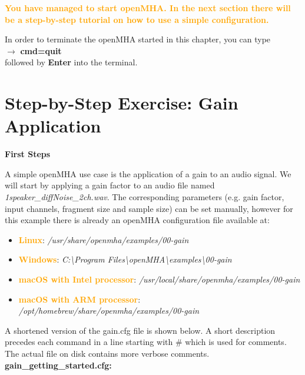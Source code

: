 \documentclass[11pt,a4paper,twoside]{article}
\newcommand{\+}{\discretionary{\mbox{\scriptsize$\hookleftarrow$}}{}{}}
\begin{document}
{{\textcolor{orange}{\textbf{You have managed to start openMHA. In the next section there will be a step-by-step tutorial on how to use a simple configuration.}}

\vspace{1cm}

In order to terminate the openMHA started in this chapter,
you can type \\
$\rightarrow$ {\ttfamily \textbf{cmd=quit}} \\
followed by \textbf{Enter} into the terminal.



\newpage

\section{Step-by-Step Exercise: Gain Application}

\textbf{First Steps}
\label{sec:first_steps}

A simple openMHA use case is the application of a gain to an audio signal.
We will start by applying a gain factor to an audio file named {{\ttfamily \textit{1speaker\_diffNoise\_2ch.wav}}}. The corresponding parameters (e.g. gain factor, input channels, fragment size and sample size) can be set manually, however for this example there is already an openMHA configuration file available at: 
\begin{itemize}\label{list:examples-location}
\item \textcolor{orange}{\textbf{Linux}}: \textit{/usr/share/openmha/examples/00-gain} 
\item \textcolor{orange}{\textbf{Windows}}: \textit{C:\textbackslash Program Files\textbackslash openMHA\textbackslash examples\textbackslash 00-gain}
\item \textcolor{orange}{\textbf{macOS with Intel processor}}: \textit{/usr/local/share/openmha/examples/00-gain} 
\item \textcolor{orange}{\textbf{macOS with ARM processor}}: \textit{/opt/homebrew/share/openmha/examples/00-gain}
\end{itemize}

A shortened version of the gain.cfg file is shown below.
A short description precedes each command
in a line starting with \# which is used for comments.
The actual file on disk contains more verbose comments.
\\

\textbf{gain\_getting\_started.cfg:} \\

}}
\end{document}
